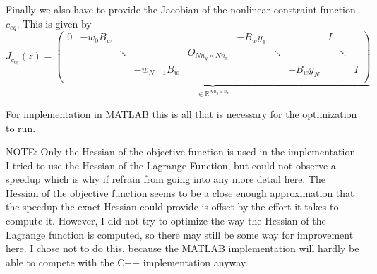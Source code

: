 \documentclass[
12pt, %
a4paper, %
onecolumn, %
portrait %
]{article}
\begin{document}
Finally we also have to provide the Jacobian of the nonlinear constraint function $c_{eq}$. This is given by
\begin{equation}
J_{c_{eq}}(z) = 
\underbrace{
\begin{pmatrix}
0 & -w_0 B_w &        &              &                        & -B_w y_1 &        &          & I &        &   \\
  &          & \ddots &              & O_{N n_y \times N n_u} &          & \ddots &          &   & \ddots &   \\
  &          &        & -w_{N-1} B_w &                        &          &        & -B_w y_N &   &        & I \\
\end{pmatrix}}_{
\in \mathbb{R}^{N n_y \times n_z}}
\end{equation}

For implementation in MATLAB this is all that is necessary for the optimization to run.

NOTE: Only the Hessian of the objective function is used in the implementation. I tried to use the Hessian of the Lagrange Function, but could not observe a speedup which is why if refrain from going into any more detail here. The Hessian of the objective function seems to be a close enough approximation that the speedup the exact Hessian could provide is offset by the effort it takes to compute it. However, I did not try to optimize the way the Hessian of the Lagrange function is computed, so there may still be some way for improvement here. I chose not to do this, because the MATLAB implementation will hardly be able to compete with the C++ implementation anyway.
\end{document}

